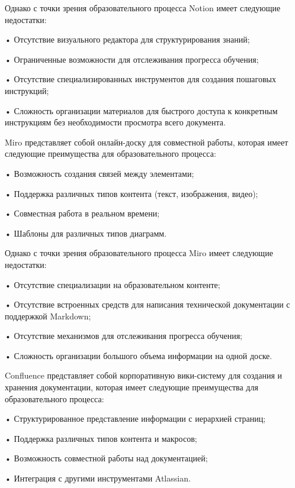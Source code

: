 {  \par \redline Однако с точки зрения образовательного процесса Notion имеет следующие недостатки:
  
  \par \redline • Отсутствие визуального редактора для структурирования знаний;
  \par \redline • Ограниченные возможности для отслеживания прогресса обучения;
  \par \redline • Отсутствие специализированных инструментов для создания пошаговых инструкций;
  \par \redline • Сложность организации материалов для быстрого доступа к конкретным инструкциям без необходимости просмотра всего документа.

  \par \redline Miro представляет собой онлайн-доску для совместной работы, которая имеет следующие преимущества для образовательного процесса:
  
  \par \redline • Возможность создания связей между элементами;
  \par \redline • Поддержка различных типов контента (текст, изображения, видео);
  \par \redline • Совместная работа в реальном времени;
  \par \redline • Шаблоны для различных типов диаграмм.
  
  \par \redline Однако с точки зрения образовательного процесса Miro имеет следующие недостатки:
  
  \par \redline • Отсутствие специализации на образовательном контенте;
  \par \redline • Отсутствие встроенных средств для написания технической документации с поддержкой Markdown;
  \par \redline • Отсутствие механизмов для отслеживания прогресса обучения;
  \par \redline • Сложность организации большого объема информации на одной доске.

  \par \redline Confluence представляет собой корпоративную вики-систему для создания и хранения документации, которая имеет следующие преимущества для образовательного процесса:
  
  \par \redline • Структурированное представление информации с иерархией страниц;
  \par \redline • Поддержка различных типов контента и макросов;
  \par \redline • Возможность совместной работы над документацией;
  \par \redline • Интеграция с другими инструментами Atlassian.
  
}
